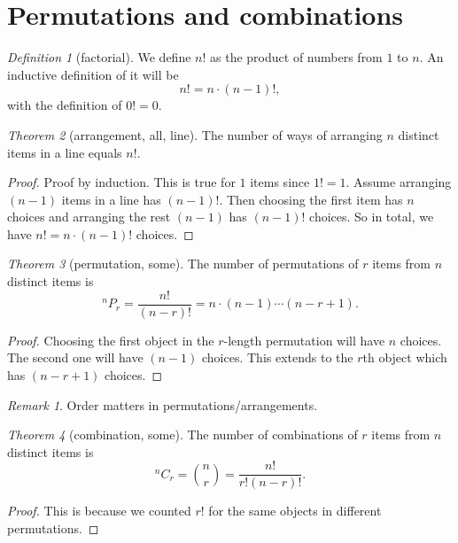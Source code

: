\documentclass[8pt]{article}
\theoremstyle{remark}
\newtheorem{theorem}{Theorem}[section]
\newtheorem{definition}[theorem]{Definition}
\newtheorem*{remark}{Remark}
\begin{document}
        

    \section{Permutations and combinations}

        \begin{definition}[factorial]
            We define $n!$ as the product of numbers from $1$ to $n$. An inductive definition of it will be
            $$
                n! = n \cdot (n-1)!,
            $$
            with the definition of $0! = 0$.
        \end{definition}

        \begin{theorem}[arrangement, all, line]
            The number of ways of arranging $n$ distinct items in a line equals $n!$.
            \begin{proof}
                Proof by induction. This is true for $1$ items since $1! = 1$. Assume arranging $(n - 1)$ items in a line has $(n - 1)!$. Then choosing the first item has $n$ choices and arranging the rest $(n - 1)$ has $(n - 1)!$ choices. So in total, we have $n! = n \cdot (n - 1)!$ choices. 
            \end{proof}
        \end{theorem}

        \begin{theorem}[permutation, some]
            The number of permutations of $r$ items from $n$ distinct items is
            $$
                ^nP_r = \frac{n!}{(n-r)!} = n \cdot (n-1) \cdots (n - r + 1).
            $$
            \begin{proof}
                Choosing the first object in the $r$-length permutation will have $n$ choices. The second one will have $(n - 1)$ choices. This extends to the $r$th object which has $(n - r + 1)$ choices.
            \end{proof}
        \end{theorem}

        \begin{remark}
            Order matters in permutations/arrangements.
        \end{remark}

        \begin{theorem}[combination, some]
            The number of combinations of $r$ items from $n$ distinct items is
            $$
                ^nC_r = \binom{n}{r} = \frac{n!}{r! (n-r)!}.
            $$
            \begin{proof}
                This is because we counted $r!$ for the same objects in different permutations.
            \end{proof}
        \end{theorem}
\end{document}
